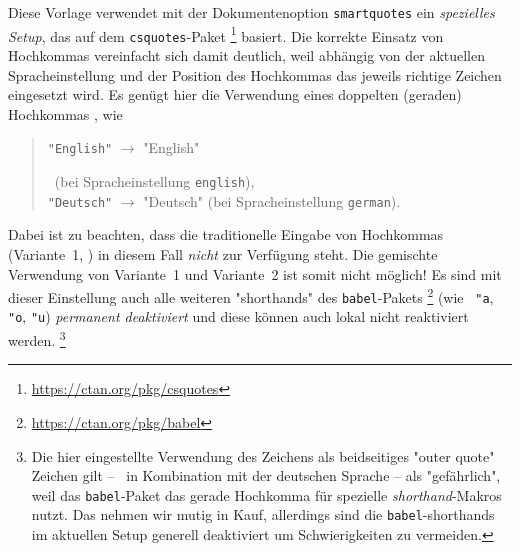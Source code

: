 Diese Vorlage verwendet mit der Dokumentenoption \texttt{smartquotes}
ein \emph{spezielles Setup}, das auf dem \texttt{csquotes}-Paket%
\footnote{\url{https://ctan.org/pkg/csquotes}}
basiert.
Die korrekte Einsatz von Hochkommas vereinfacht sich damit deutlich, weil
abhängig von der aktuellen Spracheinstellung und der Position des Hochkommas
das jeweils richtige Zeichen eingesetzt wird.
Es genügt hier die Verwendung eines doppelten (geraden) Hochkommas \texttt{\textquotedbl}, wie \zB
%
\begin{quote}
\begin{english}\verb!"English"! $\rightarrow$ "English"\end{english}\ (bei Spracheinstellung \texttt{english}),\\
\verb!"Deutsch"! $\rightarrow$ "Deutsch" (bei Spracheinstellung \texttt{german}).
\end{quote}
%
Dabei ist zu beachten, dass die traditionelle Eingabe von Hochkommas (Variante~1, \so) in diesem Fall \emph{nicht}
zur Verfügung steht. Die gemischte Verwendung von Variante~1 und Variante~2 ist somit
nicht möglich! Es sind mit dieser Einstellung auch alle weiteren "shorthands" des 
\texttt{babel}-Pakets%
\footnote{\url{https://ctan.org/pkg/babel}}
(wie \zB\ \verb!"a!, \verb!"o!, \verb!"u!) \emph{permanent deaktiviert} und diese können
auch lokal nicht reaktiviert werden.%
\footnote{Die hier eingestellte Verwendung des \texttt{\textquotedbl} Zeichens als 
beidseitiges "outer quote" Zeichen gilt -- \va\ in Kombination mit der deutschen Sprache --
als "gefährlich", weil das \texttt{babel}-Paket das gerade Hochkomma für spezielle
\emph{shorthand}-Makros nutzt. Das nehmen wir mutig in Kauf, allerdings sind die 
\texttt{babel}-shorthands im aktuellen Setup generell deaktiviert um Schwierigkeiten 
zu vermeiden.}


